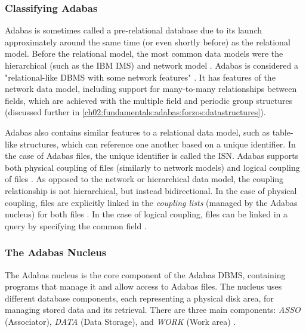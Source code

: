 \subsubsection{Classifying Adabas}
\label{ch02:fundamentals:adabas:forzos:classifying}
Adabas is sometimes called a pre-relational database \cite{ibm_redpaper_key} due to its launch approximately around the same time (or even shortly before) as the relational model. Before the relational model, the most common data models were the hierarchical (such as the IBM IMS) and network model \cite{stonebrakerwhatgoesaroundcomesaround}. Adabas is considered a "relational-like \ac{DBMS} with some network features" \cite{adabashybrid}. It has features of the network data model, including support for many-to-many relationships between fields, which are achieved with the multiple field and periodic group structures (discussed further in \ref{ch02:fundamentals:adabas:forzos:datastructures}).

Adabas also contains similar features to a relational data model, such as table-like structures, which can reference one another based on a unique identifier. In the case of Adabas files, the unique identifier is called the \ac{ISN}. Adabas supports both physical coupling of files (similarly to network models) and logical coupling of files \cite{adabasconcepts}. As opposed to the network or hierarchical data model, the coupling relationship is not hierarchical, but instead bidirectional. In the case of physical coupling, files are explicitly linked in the \textit{coupling lists} (managed by the Adabas nucleus) for both files \cite{adabashybrid}. In the case of logical coupling, files can be linked in a query by specifying the common field \cite{adabasconcepts}. %

\subsubsection{The Adabas Nucleus}
The Adabas nucleus is the core component of the Adabas \ac{DBMS}, containing programs that manage it and allow access to Adabas files. The nucleus uses different database components, each representing a physical disk area, for managing stored data and its retrieval. There are three main components: \textit{ASSO} (Associator), \textit{DATA} (Data Storage), and \textit{WORK} (Work area) \cite{adabasconcepts}.

